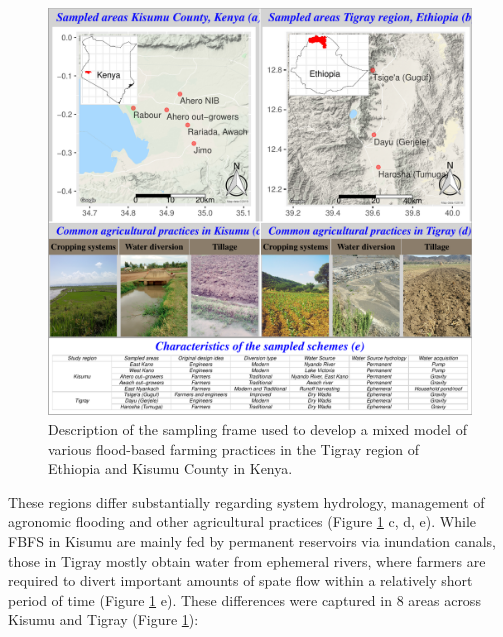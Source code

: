 \documentclass[]{elsarticle} %
\begin{document}
\begin{figure}[!h]

{\centering \includegraphics[width=1\linewidth,]{figures/Modelling_FBFS_study_area_4} 

}

\caption{Description of the sampling frame used to develop a mixed model of various flood-based farming practices in the Tigray region of Ethiopia and Kisumu County in Kenya.}\label{fig:fig1}
\end{figure}

These regions differ substantially regarding system hydrology, management of agronomic flooding and other agricultural practices (Figure \ref{fig:fig1} c, d, e). While FBFS in Kisumu are mainly fed by permanent reservoirs via inundation canals, those in Tigray mostly obtain water from ephemeral rivers, where farmers are required to divert important amounts of spate flow within a relatively short period of time (Figure \ref{fig:fig1} e).
These differences were captured in 8 areas across Kisumu and Tigray (Figure \ref{fig:fig1}):
\end{document}
